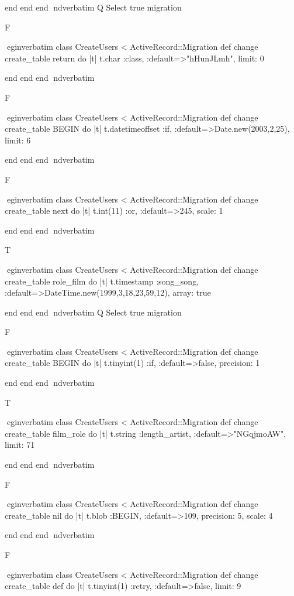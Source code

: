     end 
  end 
end
nd{verbatim}
Q
 Select true migration

F

egin{verbatim}
 class CreateUsers < ActiveRecord::Migration 
  def change 
    create_table return do |t| 
      t.char :class, :default=>"hHunJLmh", limit: 0
    
    end 
  end 
end
nd{verbatim}

F

egin{verbatim}
 class CreateUsers < ActiveRecord::Migration 
  def change 
    create_table BEGIN do |t| 
      t.datetimeoffset :if, :default=>Date.new(2003,2,25), limit: 6
    
    end 
  end 
end
nd{verbatim}

F

egin{verbatim}
 class CreateUsers < ActiveRecord::Migration 
  def change 
    create_table next do |t| 
      t.int(11) :or, :default=>245, scale: 1
    
    end 
  end 
end
nd{verbatim}

T

egin{verbatim}
 class CreateUsers < ActiveRecord::Migration 
  def change 
    create_table role_film do |t| 
      t.timestamp :song_song, :default=>DateTime.new(1999,3,18,23,59,12), array: true
    
    end 
  end 
end
nd{verbatim}
Q
 Select true migration

F

egin{verbatim}
 class CreateUsers < ActiveRecord::Migration 
  def change 
    create_table BEGIN do |t| 
      t.tinyint(1) :if, :default=>false, precision: 1
    
    end 
  end 
end
nd{verbatim}

T

egin{verbatim}
 class CreateUsers < ActiveRecord::Migration 
  def change 
    create_table film_role do |t| 
      t.string :length_artist, :default=>"NGqjmoAW", limit: 71
    
    end 
  end 
end
nd{verbatim}

F

egin{verbatim}
 class CreateUsers < ActiveRecord::Migration 
  def change 
    create_table nil do |t| 
      t.blob :BEGIN, :default=>109, precision: 5, scale: 4
    
    end 
  end 
end
nd{verbatim}

F

egin{verbatim}
 class CreateUsers < ActiveRecord::Migration 
  def change 
    create_table def do |t| 
      t.tinyint(1) :retry, :default=>false, limit: 9
    
